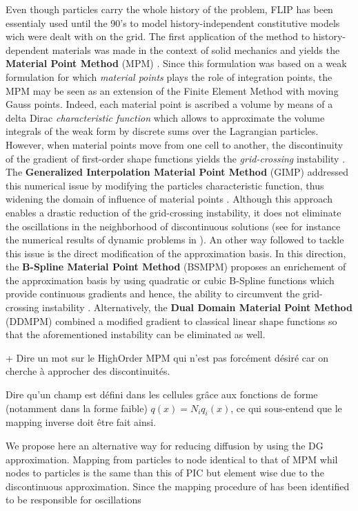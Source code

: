 Even though particles carry the whole history of the problem, FLIP has been essentialy used until the 90's to model history-independent constitutive models wich were dealt with on the grid. The first application of the method to history-dependent materials was made in the context of solid mechanics and yields the \textbf{Material Point Method} (MPM) \cite{Sulsky94}. Since this formulation was based on a weak formulation for which \textit{material points} plays the role of integration points, the MPM may be seen as an extension of the Finite Element Method with moving Gauss points. Indeed, each material point is ascribed a volume by means of a delta Dirac \textit{characteristic function} which allows to approximate the volume integrals of the weak form by discrete sums over the Lagrangian particles. However, when material points move from one cell to another, the discontinuity of the gradient of first-order shape functions yields the \textit{grid-crossing} instability \cite{Gimp}. The \textbf{Generalized Interpolation Material Point Method} (GIMP) addressed this numerical issue by modifying the particles characteristic function, thus widening the domain of influence of material points \cite{Gimp}. Although this approach enables a drastic reduction of the grid-crossing instability, it does not eliminate the oscillations in the neighborhood of discontinuous solutions (see for instance the numerical results of dynamic problems in \cite[Sec.~4.2]{Gimp}). An other way followed to tackle this issue is the direct modification of the approximation basis. In this direction, the \textbf{B-Spline Material Point Method} (BSMPM) \cite{Steffen_quadError} proposes an enrichement of the approximation basis by using quadratic or cubic B-Spline functions which provide continuous gradients and hence, the ability to circumvent the grid-crossing instability \cite{MPM_BSpline2}. Alternatively, the \textbf{Dual Domain Material Point Method} (DDMPM) \cite{DDMPM0} combined a modified gradient to classical linear shape functions so that the aforementioned instability can be eliminated as well.

+ Dire un mot sur le HighOrder MPM qui n'est pas forcément désiré car on cherche à approcher des discontinuités.


Dire qu'un champ est défini dans les cellules grâce aux fonctions de forme (notamment dans la forme faible) $q(x)=N_iq_i(x)$, ce qui sous-entend que le mapping inverse doit être fait ainsi.

We propose here an alternative way for reducing diffusion by using the DG approximation. Mapping from particles to node identical to that of MPM whil nodes to particles is the same than this of PIC but element wise due to the discontinuous approximation. Since the mapping procedure of \cite{PIC_Nishiguchi} has been identified to be responsible for oscillations \cite{Mass_Flip}

